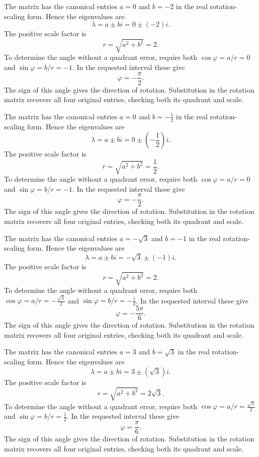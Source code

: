 The matrix has the canonical entries $a=0$ and $b=-2$ in the real rotation-scaling form. Hence the eigenvalues are
\[\lambda=a\pm bi=0\pm(-2)i.\]
The positive scale factor is
\[r=\sqrt{a^2+b^2}=2.\]
To determine the angle without a quadrant error, require both $\cos\varphi=a/r=0$ and $\sin\varphi=b/r=-1$. In the requested interval these give
\[\varphi=- \frac{\pi}{2}.\]
The sign of this angle gives the direction of rotation. Substitution in the rotation matrix recovers all four original entries, checking both its quadrant and scale.

The matrix has the canonical entries $a=0$ and $b=- \frac{1}{2}$ in the real rotation-scaling form. Hence the eigenvalues are
\[\lambda=a\pm bi=0\pm(- \frac{1}{2})i.\]
The positive scale factor is
\[r=\sqrt{a^2+b^2}=\frac{1}{2}.\]
To determine the angle without a quadrant error, require both $\cos\varphi=a/r=0$ and $\sin\varphi=b/r=-1$. In the requested interval these give
\[\varphi=- \frac{\pi}{2}.\]
The sign of this angle gives the direction of rotation. Substitution in the rotation matrix recovers all four original entries, checking both its quadrant and scale.

The matrix has the canonical entries $a=- \sqrt{3}$ and $b=-1$ in the real rotation-scaling form. Hence the eigenvalues are
\[\lambda=a\pm bi=- \sqrt{3}\pm(-1)i.\]
The positive scale factor is
\[r=\sqrt{a^2+b^2}=2.\]
To determine the angle without a quadrant error, require both $\cos\varphi=a/r=- \frac{\sqrt{3}}{2}$ and $\sin\varphi=b/r=- \frac{1}{2}$. In the requested interval these give
\[\varphi=- \frac{5 \pi}{6}.\]
The sign of this angle gives the direction of rotation. Substitution in the rotation matrix recovers all four original entries, checking both its quadrant and scale.

The matrix has the canonical entries $a=3$ and $b=\sqrt{3}$ in the real rotation-scaling form. Hence the eigenvalues are
\[\lambda=a\pm bi=3\pm(\sqrt{3})i.\]
The positive scale factor is
\[r=\sqrt{a^2+b^2}=2 \sqrt{3}.\]
To determine the angle without a quadrant error, require both $\cos\varphi=a/r=\frac{\sqrt{3}}{2}$ and $\sin\varphi=b/r=\frac{1}{2}$. In the requested interval these give
\[\varphi=\frac{\pi}{6}.\]
The sign of this angle gives the direction of rotation. Substitution in the rotation matrix recovers all four original entries, checking both its quadrant and scale.

